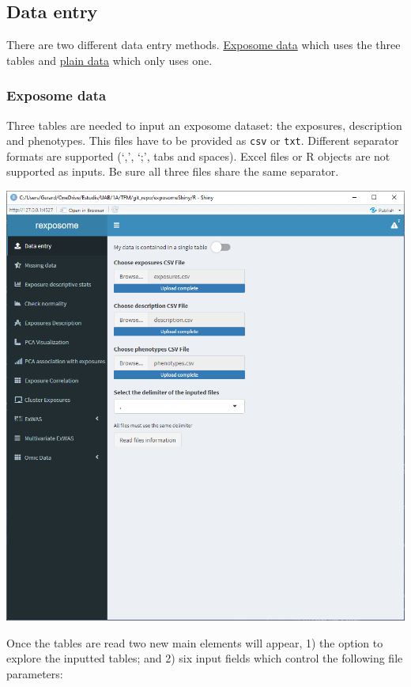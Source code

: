 \documentclass[
]{book}
\begin{document}
\hypertarget{data-entry}{%
\subsection{Data entry}\label{data-entry}}

There are two different data entry methods. \protect\hyperlink{expo_data}{Exposome data} which uses the three tables and \protect\hyperlink{plain_data_expl}{plain data} which only uses one.

\hypertarget{exposome-data}{%
\subsubsection{Exposome data}\label{exposome-data}}

Three tables are needed to input an exposome dataset: the exposures, description and phenotypes. This files have to be provided as \texttt{csv} or \texttt{txt}. Different separator formats are supported (`,', `;', tabs and spaces). Excel files or R objects are not supported as inputs. Be sure all three files share the same separator.

\includegraphics{images/analysis1_2.png}

Once the tables are read two new main elements will appear, 1) the option to explore the inputted tables; and 2) six input fields which control the following file parameters:
\end{document}
